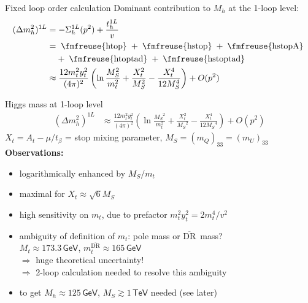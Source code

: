 \documentclass[hyperref={pdfpagelabels=false},ngerman]{beamer}
\newcommand{\fmfvcenter}[1]{\;\vcenter{\hbox{\fmfreuse{#1}}}\;}
\newcommand{\eh}[1]{\,\mathsf{#1}}
\newcommand{\MS}{\ensuremath{M_S}}
\renewcommand{\emph}{\textbf}
\newcommand{\DRbar}{\ensuremath{\overline{\text{DR}}}}
\begin{document}
\begin{frame}{Fixed loop order calculation}
  Dominant contribution to $M_h$ at the 1-loop level:
  \begin{align*}
    (\Delta m_h^2)^{1L} &= -\Sigma_h^{1L}(p^2) + \frac{t_h^{1L}}{v} \\
    &= \fmfvcenter{htop} + \fmfvcenter{hstop} + \fmfvcenter{hstopA} \\
    &\phantom{={}} + \fmfvcenter{htoptad} + \fmfvcenter{hstoptad} \\
    &\approx \frac{12 m_t^2 y_t^2}{(4\pi)^2} \left(
      \ln\frac{\MS^2}{m_t^2}
      + \frac{X_t^2}{\MS^2}
      - \frac{X_t^4}{12 \MS^4}
    \right) + O(p^2)
  \end{align*}
\end{frame}

\begin{frame}{Higgs mass at 1-loop level}
  \begin{align*}
    (\Delta m_h^2)^{1L} &\approx
    \frac{12 m_t^2 y_t^2}{(4\pi)^2} \left(
      \ln\frac{\MS^2}{m_t^2}
      + \frac{X_t^2}{\MS^2}
      - \frac{X_t^4}{12 \MS^4}
    \right) + O(p^2)
  \end{align*}
  $X_t = A_t - \mu/t_\beta$ = stop mixing parameter,
  $\MS = (m_Q)_{33} = (m_U)_{33}$
  \\[1em]
  \emph{Observations:}
  \begin{itemize}
  \item logarithmically enhanced by $\MS / m_t$
  \item maximal for $X_t \approx \sqrt{6} \MS$
  \item high sensitivity on $m_t$, due to prefactor $m_t^2 y_t^2 = 2 m_t^4/v^2$
  \item ambiguity of definition of $m_t$: pole mass or \DRbar\ mass? \\
    $M_t \approx 173.3\eh{GeV}$, $m_t^{\DRbar} \approx 165\eh{GeV}$ \\
    $\Rightarrow$ huge theoretical uncertainty!\\
    $\Rightarrow$ 2-loop calculation needed to resolve this ambiguity
  \item to get $M_h \approx 125\eh{GeV}$, $\MS \gtrsim 1\eh{TeV}$ needed
    (see later)
  \end{itemize}
\end{frame}
\end{document}
